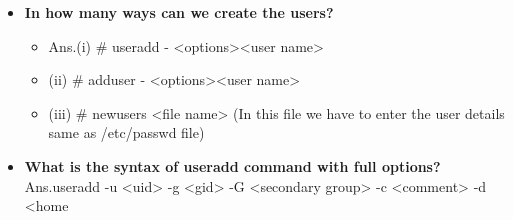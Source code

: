 \begin{enumerate}
\begin {itemize}
    \begin {itemize}
    \item Ans./etc/passwd  -----> Stores user's information like user name, uid, home directory and shell ...etc.,\newline
    \item/etc/shadow  ----> Stores user's password in encrypted form and other information.\newline
    \item/etc/group  ------> Stores group's information like group name, gid and other information.\newline
    \item/etc/gshadow ---> Stores group's password in encrypted form.\newline
    \item/etc/passwd-  ---> Stores the  /etc/passwd   file backup copy.\newline
    \item/etc/shadow- ---> Stores the /etc/shadow  file backup copy.\newline
    \item/etc/default/useradd  ----> Whenever the user created user's default settings taken from this file.\newline
    \item/etc/login.defs  ----> user's login defaults settings information taken from this file.\newline
    \item/etc/skell   ------> Stores user's all environmental variables files and these are copied from this directory to user's home directory\newline
    \end{itemize}
    \bigskip
    \bigskip
    \item \textbf {In how many ways can we create the users?}
    \begin {itemize}
    \item Ans.(i)   # useradd    - <options><user name>
    \item (ii)  # adduser    - <options><user name>
    \item (iii) # newusers    <file name>   (In this file we have to enter the user details same as /etc/passwd   file)\newline
    \end {itemize}
    \bigskip
    \bigskip
    \item\textbf{What is the syntax of useradd command with full options?}
         Ans.useradd  -u <uid>  -g <gid>  -G <secondary group> -c  <comment>  -d <home \newline

\end{itemize}
\end{enumerate}
